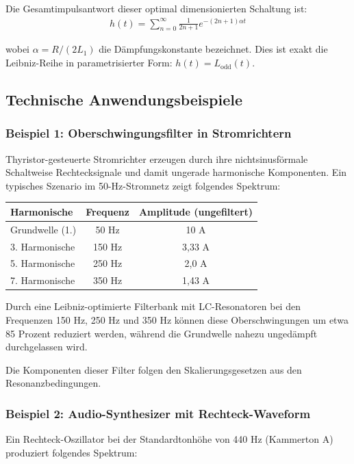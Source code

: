 \documentclass[a4paper,12pt,twoside]{report}
\theoremstyle{definition}
\begin{document}
Die Gesamtimpulsantwort dieser optimal dimensionierten Schaltung ist:
\begin{align}
	h(t) = \sum_{n=0}^{\infty} \frac{1}{2n+1} e^{-(2n+1)\alpha t}
\end{align}

wobei $\alpha = R/(2L_1)$ die Dämpfungskonstante bezeichnet. Dies ist exakt die Leibniz-Reihe in parametrisierter Form: $h(t) = L_{\text{odd}}(t)$.

\subsection{Technische Anwendungsbeispiele}

\subsubsection*{Beispiel 1: Oberschwingungsfilter in Stromrichtern}

Thyristor-gesteuerte Stromrichter erzeugen durch ihre nichtsinusförmale Schaltweise Rechtecksignale und damit ungerade harmonische Komponenten. Ein typisches Szenario im 50-Hz-Stromnetz zeigt folgendes Spektrum:

\begin{center}
\begin{tabular}{l|c|c}
Harmonische & Frequenz & Amplitude (ungefiltert) \\
\hline
Grundwelle (1.) & 50 Hz & 10 A \\
3. Harmonische & 150 Hz & 3,33 A \\
5. Harmonische & 250 Hz & 2,0 A \\
7. Harmonische & 350 Hz & 1,43 A
\end{tabular}
\end{center}

Durch eine Leibniz-optimierte Filterbank mit LC-Resonatoren bei den Frequenzen 150 Hz, 250 Hz und 350 Hz können diese Oberschwingungen um etwa 85 Prozent reduziert werden, während die Grundwelle nahezu ungedämpft durchgelassen wird.

Die Komponenten dieser Filter folgen den Skalierungsgesetzen aus den Resonanzbedingungen.

\subsubsection*{Beispiel 2: Audio-Synthesizer mit Rechteck-Waveform}

Ein Rechteck-Oszillator bei der Standardtonhöhe von 440 Hz (Kammerton A) produziert folgendes Spektrum:
\end{document}
